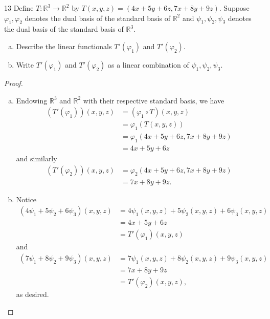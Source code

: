 \documentclass{extarticle}
\newenvironment{problem}[1]{\begin{prob*}{#1}{}}{\end{prob*}}
\newcommand{\R}{\mathbb{R}}
\begin{document}
\begin{problem}{13}
Define $T:\R^3\to\R^2$ by $T(x,y,z) = (4x + 5y + 6z, 7x + 8y + 9z)$.  Suppose $\varphi_1,\varphi_2$ denotes the dual basis of the standard basis of $\R^2$ and $\psi_1,\psi_2,\psi_3$ denotes the dual basis of the standard basis of $\R^3$.  
\begin{enumerate}[(a)]
\item Describe the linear functionals $T'(\varphi_1)$ and $T'(\varphi_2)$.
\item Write $T'(\varphi_1)$ and $T'(\varphi_2)$ as a linear combination of $\psi_1,\psi_2,\psi_3$.  
\end{enumerate}
\end{problem}
\begin{proof}
\begin{enumerate}[(a)]
\item Endowing $\R^3$ and $\R^2$ with their respective standard basis, we have
\begin{align*}
(T'(\varphi_1))(x, y, z) &= (\varphi_1\circ T)(x, y, z)\\
&= \varphi_1(T(x, y, z))\\
&= \varphi_1(4x + 5y + 6z, 7x + 8y + 9z)\\
&= 4x + 5y + 6z
\end{align*}
and similarly
\begin{align*}
(T'(\varphi_2))(x, y, z) &= \varphi_2(4x + 5y + 6z, 7x + 8y + 9z)\\
&= 7x + 8y + 9z.
\end{align*}
\item Notice
\begin{align*}
(4\psi_1 + 5\psi_2 + 6\psi_3)(x, y, z) &= 4\psi_1(x,y,z) + 5\psi_2(x,y,z) + 6\psi_3(x,y,z) \\
&= 4x + 5y + 6z\\
&= T'(\varphi_1)(x, y, z)
\end{align*}
and 
\begin{align*}
(7\psi_1 + 8\psi_2 + 9\psi_3)(x, y, z) &= 7\psi_1(x,y,z) + 8\psi_2(x,y,z) + 9\psi_3(x,y,z) \\
&= 7x + 8y + 9z\\
&= T'(\varphi_2)(x, y, z),
\end{align*}
as desired. \qedhere
\end{enumerate}
\end{proof}
\end{document}
